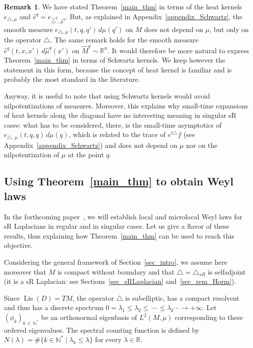 \documentclass[10pt]{amsart}
\theoremstyle{definition}\newtheorem{defi}[theo]{Definition}\newtheorem{rema}[theo]{Remark}\newtheorem{exam}[theo]{Example}\newtheorem{exem}[theo]{Example}\newtheorem{nota}[theo]{Notation}
\newcommand*\R{\mathbb{R}}
\newcommand*\N{\mathbb{N}}
\DeclareMathOperator{\Lie}{Lie}
\renewcommand{\leq}{\leqslant}
\begin{document}
\begin{rema}
We have stated Theorem~\ref{main_thm} in terms of the heat kernels $e_{\triangle,\mu}$ and $\widehat{e}^{q} = e_{\widehat{\triangle}^{q},\,\widehat{\mu}^{q}} $. But, as explained in Appendix~\ref{appendix_Schwartz}, the smooth measure $e_{\triangle,\mu}(t,q,q')\, d\mu(q')$ on $M$ does not depend on $\mu$, but only on the operator $\triangle$. The same remark holds for the smooth measure $\widehat{e}^{q}(t,x,x')\, d\widehat{\mu}^{q}(x')$ on $\widehat{M}^q\sim\R^n$. It would therefore be more natural to express Theorem~\ref{main_thm} in terms of Schwartz kernels. We keep however the statement in this form, because the concept of heat kernel is familiar and is probably the most standard in the literature.

Anyway, it is useful to note that using Schwartz kernels would avoid nilpotentizations of measures. Moreover, this explains why small-time expansions of heat kernels along the diagonal have no interesting meaning in singular sR cases: what has to be considered, there, is the small-time asymptotics of $e_{\triangle,\,\mu}(t,q,q)\, d\mu(q)$, which is related to the trace of $e^{t\triangle}f$ (see Appendix~\ref{appendix_Schwartz}) and does not depend on $\mu$ nor on the nilpotentization of $\mu$ at the point $q$.
\end{rema}



\subsection{Using Theorem~\ref{main_thm} to obtain Weyl laws}\label{sec_useful}
In the forthcoming paper~\cite{CHT-II}, we will establish local and microlocal Weyl laws for sR Laplacians in regular and in singular cases. Let us give a flavor of these results, thus explaining how Theorem~\ref{main_thm} can be used to reach this objective.

Considering the general framework of Section~\ref{sec_intro}, we assume here moreover that $M$ is compact without boundary and that $\triangle = \triangle_{sR}$ is selfadjoint (it is a sR Laplacian: see Sections~\ref{sec_sRLaplacian} and~\ref{sec_rem_Horm}).

Since $\Lie(D) = TM$, the operator $\triangle$ is subelliptic, has a compact resolvent and thus has a discrete spectrum $0=\lambda_1\leq\lambda_2\leq\,\cdots\,\leq\lambda_k\cdots\rightarrow+\infty$. Let $(\phi_k)_{k\,\in\,\N^*}$ be an orthonormal eigenbasis of $L^2(M,\mu)$ corresponding to these ordered eigenvalues. The spectral counting function is defined by $N(\lambda) = \# \{k\in\N^* \mid \lambda_k \leq \lambda \}$ for every $\lambda\in\R$.
\end{document}
